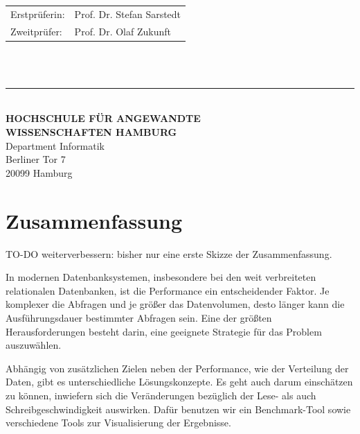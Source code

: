 \begin{titlepage}
  \hspace*{37mm}
  \begin{minipage}{0.5\linewidth}
    \begin{tabular}{@{}ll}
      Erstprüferin: & Prof. Dr. Stefan Sarstedt\\[-.3mm]
      Zweitprüfer: & Prof. Dr. Olaf Zukunft \\
    \end{tabular}\\

    \,\rule{9mm}{1mm}\\[1.5mm]

    \textbf{HOCHSCHULE FÜR ANGEWANDTE}\\
    \textbf{WISSENSCHAFTEN HAMBURG}\\
    Department Informatik\\
    Berliner Tor 7\\
    20099 Hamburg
  \end{minipage}
\end{titlepage}
\restoregeometry

\thispagestyle{empty}
\section*{Zusammenfassung}

TO-DO weiterverbessern: bisher nur eine erste Skizze der Zusammenfassung.

In modernen Datenbanksystemen, insbesondere bei den weit verbreiteten relationalen Datenbanken, ist die Performance ein entscheidender Faktor.
Je komplexer die Abfragen und je größer das Datenvolumen, desto länger kann die Ausführungsdauer bestimmter Abfragen sein.
Eine der größten Herausforderungen besteht darin, eine geeignete Strategie für das Problem auszuwählen.

Abhängig von zusätzlichen Zielen neben der Performance, wie der Verteilung der Daten, gibt es unterschiedliche Lösungskonzepte.
Es geht auch darum einschätzen zu können, inwiefern sich die Veränderungen bezüglich der Lese- als auch Schreibgeschwindigkeit auswirken.
Dafür benutzen wir ein Benchmark-Tool sowie verschiedene Tools zur Visualisierung der Ergebnisse.


